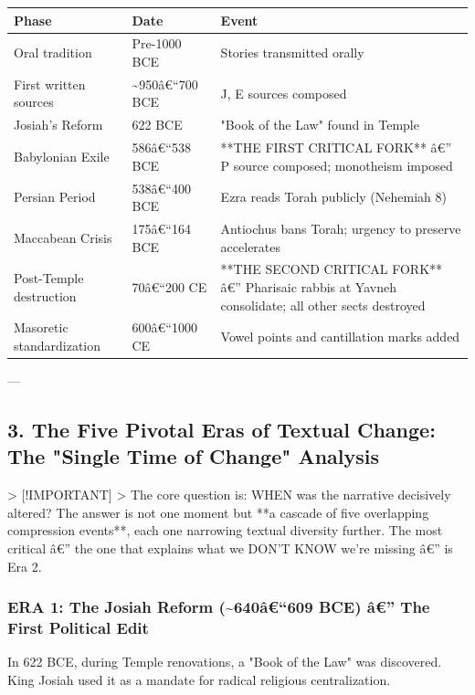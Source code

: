 \documentclass[aps,prd,11pt,onecolumn,superscriptaddress,nofootinbib,floatfix]{revtex4-2}
\begin{document}
\begin{table}[h!]
\centering
\begin{tabular}{p{3cm}p{3cm}p{3cm}}
\hline
Phase & Date & Event \\
\hline
Oral tradition & Pre-1000 BCE & Stories transmitted orally \\
First written sources & \textasciitilde{}950â€``700 BCE & J, E sources composed \\
Josiah's Reform & 622 BCE & "Book of the Law" found in Temple \\
Babylonian Exile & 586â€``538 BCE & **THE FIRST CRITICAL FORK** â€'' P source composed; monotheism imposed \\
Persian Period & 538â€``400 BCE & Ezra reads Torah publicly (Nehemiah 8) \\
Maccabean Crisis & 175â€``164 BCE & Antiochus bans Torah; urgency to preserve accelerates \\
Post-Temple destruction & 70â€``200 CE & **THE SECOND CRITICAL FORK** â€'' Pharisaic rabbis at Yavneh consolidate; all other sects destroyed \\
Masoretic standardization & 600â€``1000 CE & Vowel points and cantillation marks added \\
\hline
\end{tabular}
\end{table}



---


\subsection{3. The Five Pivotal Eras of Textual Change: The "Single Time of Change" Analysis}


> [!IMPORTANT]
> The core question is: WHEN was the narrative decisively altered? The answer is not one moment but **a cascade of five overlapping compression events**, each one narrowing textual diversity further. The most critical â€'' the one that explains what we DON'T KNOW we're missing â€'' is Era 2.


\subsubsection{ERA 1: The Josiah Reform (\textasciitilde{}640â€``609 BCE) â€'' The First Political Edit}


In 622 BCE, during Temple renovations, a "Book of the Law" was discovered. King Josiah used it as a mandate for radical religious centralization.
\end{document}
